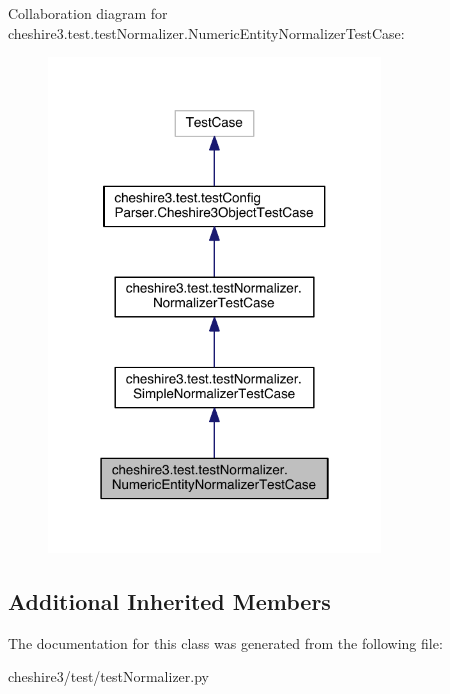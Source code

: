 Collaboration diagram for cheshire3.\-test.\-test\-Normalizer.\-Numeric\-Entity\-Normalizer\-Test\-Case\-:
\nopagebreak
\begin{figure}[H]
\begin{center}
\leavevmode
\includegraphics[width=250pt]{classcheshire3_1_1test_1_1test_normalizer_1_1_numeric_entity_normalizer_test_case__coll__graph}
\end{center}
\end{figure}
\subsection*{Additional Inherited Members}


The documentation for this class was generated from the following file\-:\begin{DoxyCompactItemize}
\item 
cheshire3/test/test\-Normalizer.\-py\end{DoxyCompactItemize}
